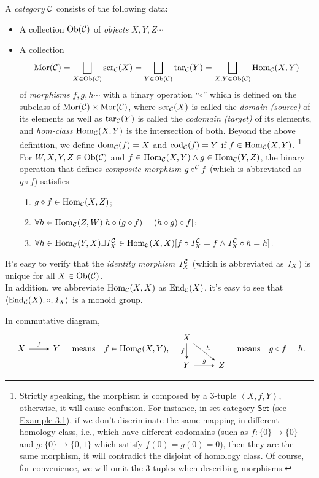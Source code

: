 \documentclass{article}
\begin{document}
\begin{defi}\label{category}
	A \emph{category} $\mathcal{C}$ consists of the following data:
	\begin{itemize}
		\item A collection $\mathrm{Ob}(\mathcal{C})$ of \emph{objects} $X,Y,Z\cdots$
		\item A collection 
			$$\mathrm{Mor}(\mathcal{C})=\bigsqcup_{X\in\mathrm{Ob}(\mathcal{C})}{\mathrm{scr}_{\mathcal{C}}(X)}=\bigsqcup_{Y\in\mathrm{Ob}(\mathcal{C})}{\mathrm{tar}_{\mathcal{C}}(Y)}=\bigsqcup_{X,Y\in\mathrm{Ob}(\mathcal{C})}{\mathrm{Hom}_{\mathcal{C}}(X,Y)}$$
			of \emph{morphisms} $f,g,h\cdots$ with a binary operation ``$\circ$'' which is defined on the subclass of $\mathrm{Mor}(\mathcal{C})\times\mathrm{Mor}(\mathcal{C})$, where $\mathrm{scr}_{\mathcal{C}}(X)$ is called the \emph{domain (source)} of its elements as well as $\mathrm{tar}_{\mathcal{C}}(Y)$ is called the \emph{codomain (target)} of its elements, and \emph{hom-class} $\mathrm{Hom}_{\mathcal{C}}(X,Y)$ is the intersection of both. Beyond the above definition, we define $\mathrm{dom}_{\mathcal{C}}(f)=X$ and $\mathrm{cod}_{\mathcal{C}}(f)=Y$ if $f\in\mathrm{Hom}_{\mathcal{C}}(X,Y)$.
				\footnote{\label{sign} Strictly speaking, the morphism is composed by a 3-tuple $\left<X,f,Y\right>$, otherwise, it will cause confusion. For instance, in set category $\mathsf{Set}$ (see \hyperref[exm3]{Example 3.1}), if we don't discriminate the same mapping in different homology class, i.e., which have different codomains (such as $f:\{0\}\to\{0\}$ and $g:\{0\}\to\{0,1\}$ which satisfy $f(0)=g(0)=0$), then they are the same morphism, it will contradict the disjoint of homology class. Of course, for convenience, we will omit the 3-tuples when describing morphisms.}
			For $W,X,Y,Z\in\mathrm{Ob}(\mathcal{C})$ and $f\in\mathrm{Hom}_{\mathcal{C}}(X,Y)\wedge g\in\mathrm{Hom}_{\mathcal{C}}(Y,Z)$, the binary operation that defines \emph{composite morphism} $g\circ^{\mathcal{C}} f$ (which is abbreviated as $g\circ f$) satisfies
			\begin{enumerate}
				\item $g\circ f\in\mathrm{Hom}_{\mathcal{C}}(X,Z)$;
				\item $\forall h\in\mathrm{Hom}_{\mathcal{C}}(Z,W)[h\circ(g\circ f)=(h\circ g)\circ f]$;
				\item $\forall h\in\mathrm{Hom}_{\mathcal{C}}(Y,X)\exists \mathit{1}^{\mathcal{C}}_X\in\mathrm{Hom}_{\mathcal{C}}(X,X)[f\circ\mathit{1}^{\mathcal{C}}_X=f\wedge\mathit{1}^{\mathcal{C}}_X\circ h=h]$.
			\end{enumerate}
	\end{itemize}
	
	It's easy to verify that the \emph{identity morphism} $\mathit{1}^{\mathcal{C}}_X$ (which is abbreviated as $\mathit{1}_X$) is unique for all $X\in\mathrm{Ob}(\mathcal{C})$.\\
	In addition, we abbreviate $\mathrm{Hom}_{\mathcal{C}}(X,X)$ as $\mathrm{End}_{\mathcal{C}}(X)$, it's easy to see that $\left<\mathrm{End}_{\mathcal{C}}(X),\circ,\mathit{1}_X\right>$ is a monoid group.
	
	In commutative diagram,
	\[\begin{tikzcd}
			X\arrow[->,>=stealth,r,"f"] & Y
		\end{tikzcd}\quad\text{means}\quad f\in\Hom_\ca(X,Y),\quad
		\begin{tikzcd}
			X\arrow[->,>=stealth,d,"f"'] \arrow[->,>=stealth,rd,"h"] & \\
			Y\arrow[->,>=stealth,r,"g"] & Z
	\end{tikzcd}\quad\text{means}\quad g\circ f=h.\]
\end{defi}
\end{document}
